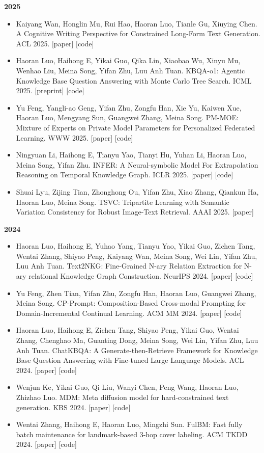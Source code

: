 \documentclass[letterpaper,11pt]{article}
\newcommand{\resumeSubHeadingListStart}{\begin{itemize}[leftmargin=*]}
\newcommand{\resumeSubHeadingListEnd}{\end{itemize}}
\begin{document}
\textbf{2025}
\vspace{-1mm}
\resumeSubHeadingListStart
\item Kaiyang Wan, Honglin Mu, Rui Hao, Haoran Luo, Tianle Gu, Xiuying Chen. A Cognitive Writing Perspective for Constrained Long-Form Text Generation. ACL 2025. [paper] [code]
\item Haoran Luo, Haihong E, Yikai Guo, Qika Lin, Xiaobao Wu, Xinyu Mu, Wenhao Liu, Meina Song, Yifan Zhu, Luu Anh Tuan. KBQA-o1: Agentic Knowledge Base Question Answering with Monte Carlo Tree Search. ICML 2025. [preprint] [code]
\item Yu Feng, Yangli-ao Geng, Yifan Zhu, Zongfu Han, Xie Yu, Kaiwen Xue, Haoran Luo, Mengyang Sun, Guangwei Zhang, Meina Song. PM-MOE: Mixture of Experts on Private Model Parameters for Personalized Federated Learning. WWW 2025. [paper] [code]
\item Ningyuan Li, Haihong E, Tianyu Yao, Tianyi Hu, Yuhan Li, Haoran Luo, Meina Song, Yifan Zhu. INFER: A Neural-symbolic Model For Extrapolation Reasoning on Temporal Knowledge Graph. ICLR 2025. [paper] [code]
\item Shuai Lyu, Zijing Tian, Zhonghong Ou, Yifan Zhu, Xiao Zhang, Qiankun Ha, Haoran Luo, Meina Song. TSVC: Tripartite Learning with Semantic Variation Consistency for Robust Image-Text Retrieval. AAAI 2025. [paper]
\resumeSubHeadingListEnd

\textbf{2024}
\vspace{-1mm}
\resumeSubHeadingListStart
\item Haoran Luo, Haihong E, Yuhao Yang, Tianyu Yao, Yikai Guo, Zichen Tang, Wentai Zhang, Shiyao Peng, Kaiyang Wan, Meina Song, Wei Lin, Yifan Zhu, Luu Anh Tuan. Text2NKG: Fine-Grained N-ary Relation Extraction for N-ary relational Knowledge Graph Construction. NeurIPS 2024. [paper] [code]
\item Yu Feng, Zhen Tian, Yifan Zhu, Zongfu Han, Haoran Luo, Guangwei Zhang, Meina Song. CP-Prompt: Composition-Based Cross-modal Prompting for Domain-Incremental Continual Learning. ACM MM 2024. [paper] [code]
\item Haoran Luo, Haihong E, Zichen Tang, Shiyao Peng, Yikai Guo, Wentai Zhang, Chenghao Ma, Guanting Dong, Meina Song, Wei Lin, Yifan Zhu, Luu Anh Tuan. ChatKBQA: A Generate-then-Retrieve Framework for Knowledge Base Question Answering with Fine-tuned Large Language Models. ACL 2024. [paper] [code]
\item Wenjun Ke, Yikai Guo, Qi Liu, Wanyi Chen, Peng Wang, Haoran Luo, Zhizhao Luo. MDM: Meta diffusion model for hard-constrained text generation. KBS 2024. [paper] [code]
\item Wentai Zhang, Haihong E, Haoran Luo, Mingzhi Sun. FulBM: Fast fully batch maintenance for landmark-based 3-hop cover labeling. ACM TKDD 2024. [paper] [code]
\resumeSubHeadingListEnd
\end{document}
